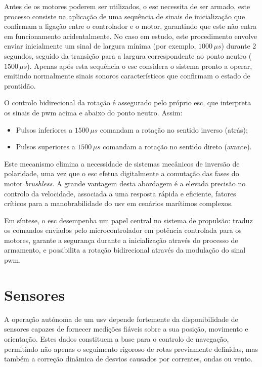 Antes de os motores poderem ser utilizados, o \gls{esc} necessita de ser armado, este processo consiste na aplicação de uma sequência de sinais de inicialização que confirmam a ligação entre o controlador e o motor, garantindo que este não entra em funcionamento acidentalmente. No caso em estudo, este procedimento envolve enviar inicialmente um sinal de largura mínima (por exemplo, $1000\,\mu s$) durante 2 segundos, seguido da transição para a largura correspondente ao ponto neutro ($1500\,\mu s$). Apenas após esta sequência o \gls{esc} considera o sistema pronto a operar, emitindo normalmente sinais sonoros característicos que confirmam o estado de prontidão.

O controlo bidirecional da rotação é assegurado pelo próprio \gls{esc}, que interpreta os sinais de \gls{pwm} acima e abaixo do ponto neutro. Assim:

\begin{itemize}
    \item Pulsos inferiores a $1500\,\mu s$ comandam a rotação no sentido inverso (atrás);
    \item Pulsos superiores a $1500\,\mu s$ comandam a rotação no sentido direto (avante).
\end{itemize}

Este mecanismo elimina a necessidade de sistemas mecânicos de inversão de polaridade, uma vez que o \gls{esc} efetua digitalmente a comutação das fases do motor \emph{brushless}. A grande vantagem desta abordagem é a elevada precisão no controlo da velocidade, associada a uma resposta rápida e eficiente, fatores críticos para a manobrabilidade do \gls{usv} em cenários marítimos complexos.

Em síntese, o \gls{esc} desempenha um papel central no sistema de propulsão: traduz os comandos enviados pelo microcontrolador em potência controlada para os motores, garante a segurança durante a inicialização através do processo de armamento, e possibilita a rotação bidirecional através da modulação do sinal \gls{pwm}.

\section{Sensores} 
\label{sec:sensores}

A operação autónoma de um \gls{usv} depende fortemente da disponibilidade de sensores capazes de fornecer medições fiáveis sobre a sua posição, movimento e orientação. Estes dados constituem a base para o controlo de navegação, permitindo não apenas o seguimento rigoroso de rotas previamente definidas, mas também a correção dinâmica de desvios causados por correntes, ondas ou vento.  

